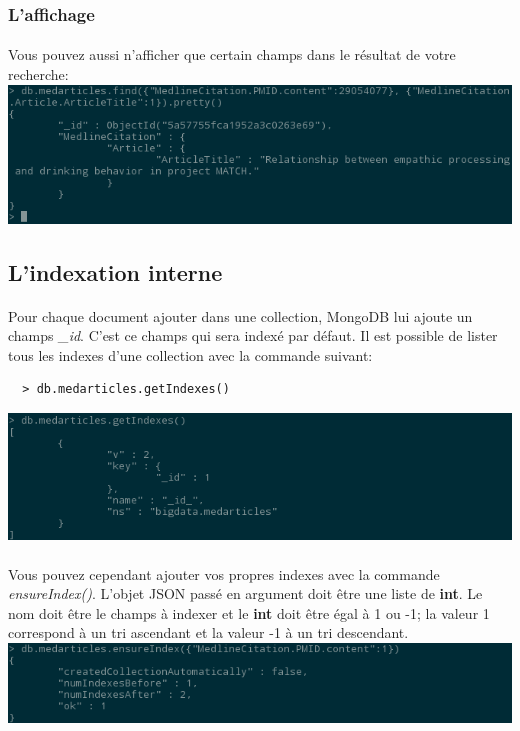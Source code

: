\documentclass{article}
\begin{document}
  \subsubsection{L'affichage}
    \paragraph{} Vous pouvez aussi n'afficher que certain champs dans le résultat
    de votre recherche:\\
    \includegraphics[scale=0.8]{mongodb/recherche_find2.png}\\
  
\subsection{L’indexation interne}
  \paragraph{} Pour chaque document ajouter dans une collection, MongoDB lui ajoute
  un champs \emph{\_id}. C'est ce champs qui sera indexé par défaut. Il est 
  possible de lister tous les indexes d'une collection avec la commande suivant:
  \begin{lstlisting}
  > db.medarticles.getIndexes()
  \end{lstlisting}
  \includegraphics[scale=0.8]{mongodb/getindexes.png}\\
  
  \paragraph{} Vous pouvez cependant ajouter vos propres indexes avec la commande
  \emph{ensureIndex()}. L'objet JSON passé en argument doit être une liste de \textbf{int}.
  Le nom doit être le champs à indexer et le \textbf{int} doit être égal à 1 ou -1; 
  la valeur 1 correspond à un tri ascendant et la valeur -1 à un tri descendant.
  \includegraphics[scale=0.8]{mongodb/ensureIndex.png}\\
  
\end{document}
